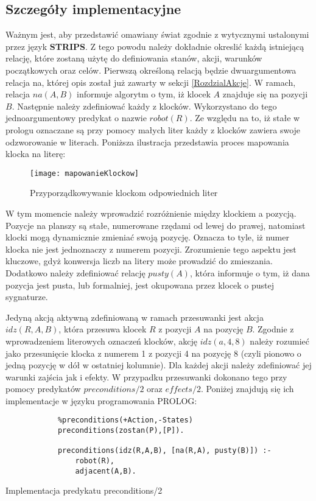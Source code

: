     \subsection{Szczegóły implementacyjne}
    Ważnym jest, aby przedstawić omawiany świat zgodnie z wytycznymi ustalonymi przez język \textbf{STRIPS}. Z tego powodu należy dokładnie okreslić 
    każdą istniejącą relację, które zostaną użytę do definiowania stanów, akcji, warunków początkowych oraz celów. 
    Pierwszą określoną relacją będzie dwuargumentowa relacja na, której opis został już zawarty w sekcji \ref{RozdzialAkcje}. W ramach,
    relacja $na(A,B)$ informuje algorytm o tym, iż klocek $A$ znajduje się na pozycji $B$. Następnie należy zdefiniować każdy z klocków. 
    Wykorzystano do tego jednoargumentowy predykat o nazwie $robot(R)$. Ze względu na to, iż stałe w prologu oznaczane są przy pomocy 
    małych liter każdy z klocków zawiera swoje odzworowanie w literach. Poniższa ilustracja przedstawia proces mapowania klocka na literę:

    \begin{figure}[H]
        \texttt{[image: mapowanieKlockow]}
        \centering
        \caption{Przyporządkowywanie klockom odpowiednich liter}
    \end{figure}

    W tym momencie należy wprowadzić rozróżnienie między klockiem a pozycją. Pozycje na planszy są stałe, numerowane rzędami od lewej do prawej,
    natomiast klocki mogą dynamicznie zmieniać swoją pozycję. Oznacza to tyle, iż numer klocka nie jest jednoznaczy z numerem pozycji. 
    Zrozumienie tego aspektu jest kluczowe, gdyż konwersja liczb na litery może prowadzić do zmieszania. 
    Dodatkowo należy zdefiniować relację $pusty(A)$, która informuje o tym, iż dana pozycja jest pusta, lub formalniej, jest okupowana 
    przez klocek o pustej sygnaturze. 

    Jedyną akcją aktywną zdefiniowaną w ramach przesuwanki jest akcja $idz(R,A,B)$, która przesuwa klocek $R$ z pozycji $A$ na pozycję $B$.
    Zgodnie z wprowadzeniem literowych oznaczeń klocków, akcję $idz(a,4,8)$ należy rozumieć jako przesunięcie klocka z numerem 1 z pozycji 4 
    na pozycję 8 (czyli pionowo o jedną pozycję w dół w ostatniej kolumnie). Dla każdej akcji należy zdefiniować jej warunki zajścia jak i efekty.
    W przypadku przesuwanki dokonano tego przy pomocy predykatów $preconditions/2$ oraz $effects/2$. Poniżej znajdują się ich implementacje 
    w języku programowania PROLOG:
    \begin{listing}[H]
        \begin{verbatim}
            %preconditions(+Action,-States)
            preconditions(zostan(P),[P]).

            preconditions(idz(R,A,B), [na(R,A), pusty(B)]) :-
                robot(R), 
                adjacent(A,B).
        \end{verbatim}
    \caption{Implementacja predykatu preconditions/2}
    \end{listing}

